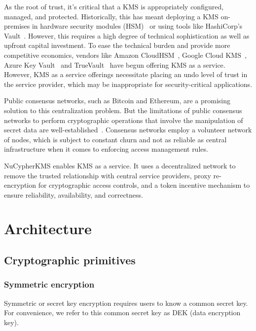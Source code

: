 \documentclass[notitlepage,longbibliography]{revtex4-1}
\begin{document}
As the root of trust, it's critical that a KMS is appropriately configured, managed, and protected.
Historically, this has meant deploying a KMS on-premises in hardware security modules (HSM)~\cite{wiki:hsm} or using tools like
HashiCorp's Vault~\cite{web:hashicorp-vault}.
However, this requires a high degree of technical sophistication as well as upfront capital investment.
To ease the technical burden and provide more competitive economics, vendors like Amazon CloudHSM~\cite{web:aws-cloudhsm},
Google Cloud KMS~\cite{web:google-cloud-kms}, Azure Key Vault~\cite{web:azure-key-vault} and TrueVault~\cite{web:truevault}
have begun offering KMS as a service.
However, KMS as a service offerings necessitate placing an undo level of trust in the service provider, which may
be inappropriate for security-critical applications.

Public consensus networks, such as Bitcoin and Ethereum, are a promising solution to this centralization problem.
But the limitations of public consensus networks to perform cryptographic operations that involve the manipulation of secret
data are well-established~\cite{cryptoeprint:2017:201}. Consensus networks employ a volunteer network of nodes,
which is subject to constant churn and not as reliable as central infrastructure when it comes to enforcing access management rules. 

NuCypherKMS enables KMS as a service. It uses a decentralized network to remove the trusted relationship with central service
providers, proxy re-encryption for cryptographic access controls, and a token incentive mechanism to ensure reliability,
availability, and correctness.

\section{Architecture}

\subsection{Cryptographic primitives}

\subsubsection{Symmetric encryption}

Symmetric or secret key encryption requires users to know a common secret key.
For convenience, we refer to this common secret key as DEK (data encryption key).
\end{document}
